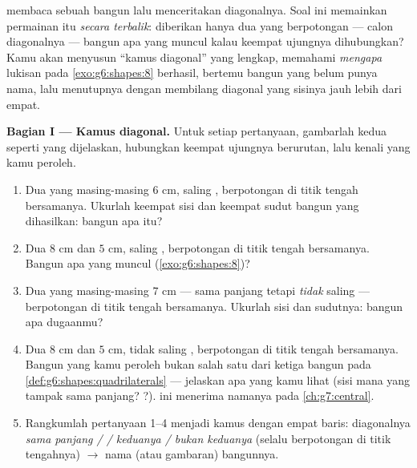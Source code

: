 \begin{problem}
\label{pb:g6:shapes:1}
 membaca sebuah bangun lalu
menceritakan diagonalnya. Soal ini memainkan permainan itu
\emph{secara terbalik}: diberikan hanya dua  yang
berpotongan --- calon diagonalnya --- bangun apa yang muncul kalau
keempat ujungnya dihubungkan? Kamu akan menyusun ``kamus diagonal''
yang lengkap, memahami \emph{mengapa} lukisan  pada
\cref{exo:g6:shapes:8} berhasil, bertemu bangun yang belum punya
nama, lalu menutupnya dengan membilang diagonal  yang
sisinya jauh lebih dari empat.

\medskip
\noindent\textbf{Bagian I --- Kamus diagonal.}
Untuk setiap pertanyaan, gambarlah kedua  seperti yang
dijelaskan, hubungkan keempat ujungnya berurutan, lalu kenali  yang kamu peroleh.
\begin{enumerate}
  \item Dua  yang masing-masing $6$ cm, saling , berpotongan di titik tengah bersamanya. Ukurlah keempat sisi
        dan keempat sudut bangun yang dihasilkan: bangun apa itu?
  \item Dua  $8$ cm dan $5$ cm, saling ,
        berpotongan di titik tengah bersamanya. Bangun apa yang
        muncul (\cref{exo:g6:shapes:8})?
  \item Dua  yang masing-masing $7$ cm --- sama panjang tetapi
        \emph{tidak} saling  --- berpotongan di titik
        tengah bersamanya. Ukurlah sisi dan sudutnya: bangun apa
        dugaanmu?
  \item Dua  $8$ cm dan $5$ cm, tidak saling ,
        berpotongan di titik tengah bersamanya. Bangun yang kamu
        peroleh bukan salah satu dari ketiga bangun pada
        \cref{def:g6:shapes:quadrilaterals} --- jelaskan apa yang kamu
        lihat (sisi mana yang tampak sama panjang? ?).  ini menerima namanya pada \cref{ch:g7:central}.
  \item Rangkumlah pertanyaan 1--4 menjadi kamus dengan empat baris:
        diagonalnya \emph{sama panjang /  / keduanya /
        bukan keduanya} (selalu berpotongan di titik tengahnya)
        $\rightarrow$ nama (atau gambaran) bangunnya.
\end{enumerate}


\end{problem}
